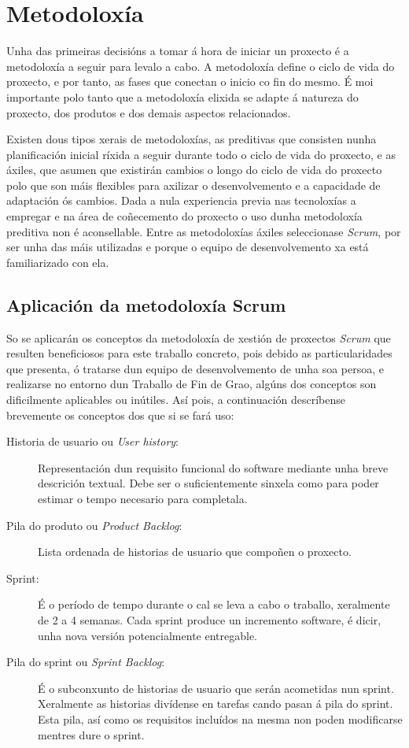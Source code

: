 \section{Metodoloxía}\label{sec:PlanXestion}
Unha das primeiras decisións a tomar á hora de iniciar un proxecto é a metodoloxía a seguir para levalo a cabo. A metodoloxía define o ciclo de vida do proxecto, e por tanto, as fases que conectan o inicio co fin do mesmo. É moi importante polo tanto que a metodoloxía elixida se adapte á natureza do proxecto, dos produtos e dos demais aspectos relacionados.

Existen dous tipos xerais de metodoloxías, as preditivas que consisten nunha planificación inicial ríxida a seguir durante todo o ciclo de vida do proxecto, e as áxiles, que asumen que existirán cambios o longo do ciclo de vida do proxecto polo que son máis flexibles para axilizar o desenvolvemento e a capacidade de adaptación ós cambios. Dada a nula experiencia previa nas tecnoloxías a empregar e  na área de coñecemento do proxecto o uso dunha metodoloxía preditiva non é aconsellable. Entre as metodoloxías áxiles seleccionase \emph{Scrum}\cite{ScrumManager}, por ser unha das máis utilizadas e porque o equipo de desenvolvemento xa está familiarizado con ela.

\subsection{Aplicación da metodoloxía Scrum}

So se aplicarán os conceptos da metodoloxía de xestión de proxectos \emph{Scrum} que resulten beneficiosos para este traballo concreto, pois debido as particularidades que presenta, ó tratarse dun equipo de desenvolvemento de unha soa persoa, e realizarse no entorno dun Traballo de Fin de Grao, algúns dos conceptos son dificilmente aplicables ou inútiles. Así pois, a continuación descríbense brevemente os conceptos dos que si se fará uso:
\begin{description}
\item[Historia de usuario ou \emph{User history}:] Representación dun requisito funcional do software mediante unha breve descrición textual. Debe ser o suficientemente sinxela como para poder estimar o tempo necesario para completala.
\item[Pila do produto ou \emph{Product Backlog}:] Lista ordenada de historias de usuario que compoñen o proxecto.
\item[Sprint:] É o período de tempo durante o cal se leva a cabo o traballo, xeralmente de 2 a 4 semanas. Cada sprint produce un incremento software, é dicir, unha nova versión potencialmente entregable.
\item[Pila do sprint ou \emph{Sprint Backlog}:] É o subconxunto de historias de usuario que serán acometidas nun sprint. Xeralmente as historias divídense en tarefas cando pasan á pila do sprint. Esta pila, así como os requisitos incluídos na mesma non poden modificarse mentres dure o sprint.
\end{description}

